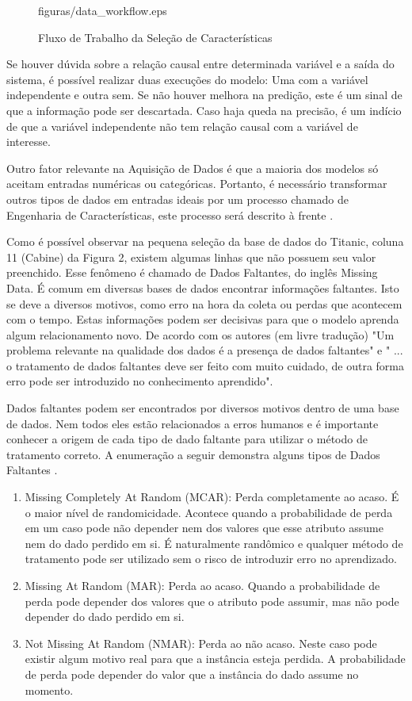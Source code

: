 \begin{figure}[!h]
{figuras/data_workflow.eps}
\caption{Fluxo de Trabalho da Seleção de Características}
\label{workflow_data}
\end{figure}

Se houver dúvida sobre a relação causal entre determinada variável e a saída do sistema, é possível realizar duas execuções do modelo: Uma com a variável independente e outra sem. Se não houver melhora na predição, este é um sinal de que a informação pode ser descartada. Caso haja queda na precisão, é um indício de que a variável independente não tem relação causal com a variável de interesse.

Outro fator relevante na Aquisição de Dados é que a maioria dos modelos só aceitam entradas numéricas ou categóricas. Portanto, é necessário transformar outros tipos de dados em entradas ideais por um processo chamado de Engenharia de Características, este processo será descrito à frente \cite{real2013}. 

Como é possível observar na pequena seleção da base de dados do Titanic, coluna 11 (Cabine) da Figura 2, existem algumas linhas que não possuem seu valor preenchido. Esse fenômeno é chamado de Dados Faltantes, do inglês Missing Data. É comum em diversas bases de dados encontrar informações faltantes. Isto se deve a diversos motivos, como erro na hora da coleta ou perdas que acontecem com o tempo. Estas informações podem ser decisivas para que o modelo aprenda algum relacionamento novo. De acordo com os autores  (em livre tradução) "Um problema relevante na qualidade dos dados é a presença de dados faltantes" e " ... o tratamento de dados faltantes deve ser feito com muito cuidado, de outra forma erro pode ser introduzido no conhecimento aprendido". 

Dados faltantes podem ser encontrados por diversos motivos dentro de uma base de dados. Nem todos eles estão relacionados a erros humanos e é importante conhecer a origem de cada tipo de dado faltante para utilizar o método de tratamento correto. A enumeração a seguir demonstra alguns tipos de Dados Faltantes \cite{stat1987}.

\begin{enumerate}
\item Missing Completely At Random (MCAR): Perda completamente ao acaso. É o maior nível de randomicidade. Acontece quando a probabilidade de perda em um caso pode não depender nem dos valores que esse atributo assume nem do dado perdido em si. É naturalmente randômico e qualquer método de tratamento pode ser utilizado sem o risco de introduzir erro no aprendizado.
\item Missing At Random (MAR): Perda ao acaso. Quando a probabilidade de perda pode depender dos valores que o atributo pode assumir, mas não pode depender do dado perdido em si.
\item Not Missing At Random (NMAR): Perda ao não acaso. Neste caso pode existir algum motivo real para que a instância esteja perdida. A probabilidade de perda pode depender do valor que a instância do dado assume no momento.
\end{enumerate}

